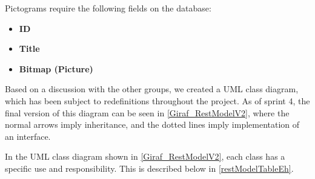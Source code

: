 Pictograms require the following fields on the database: 
\begin{itemize}
  \item \textbf{ID}
  \item \textbf{Title}
  \item \textbf{Bitmap (Picture)}
\end{itemize}

Based on a discussion with the other groups, we created a UML class diagram,
which has been subject to redefinitions throughout the project. As of sprint
4, the final version of this diagram can be seen in \autoref{Giraf_RestModelV2},
where the normal arrows imply inheritance, and the dotted lines imply
implementation of an interface.


In the UML class diagram shown in \autoref{Giraf_RestModelV2}, each class has a
specific use and responsibility. This is described below in
\autoref{restModelTableEh}.

